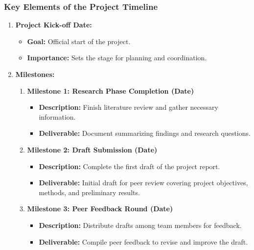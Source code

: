 \documentclass[aspectratio=169]{beamer}
\begin{document}
\begin{frame}[fragile]
    \frametitle{Key Elements of the Project Timeline}
    
    \begin{enumerate}
        \item \textbf{Project Kick-off Date:}
            \begin{itemize}
                \item \textbf{Goal:} Official start of the project.
                \item \textbf{Importance:} Sets the stage for planning and coordination.
            \end{itemize}
        
        \item \textbf{Milestones:}
            \begin{enumerate}
                \item \textbf{Milestone 1: Research Phase Completion (Date)}
                    \begin{itemize}
                        \item \textbf{Description:} Finish literature review and gather necessary information.
                        \item \textbf{Deliverable:} Document summarizing findings and research questions.
                    \end{itemize}
                    
                \item \textbf{Milestone 2: Draft Submission (Date)}
                    \begin{itemize}
                        \item \textbf{Description:} Complete the first draft of the project report.
                        \item \textbf{Deliverable:} Initial draft for peer review covering project objectives, methods, and preliminary results.
                    \end{itemize}
                    
                \item \textbf{Milestone 3: Peer Feedback Round (Date)}
                    \begin{itemize}
                        \item \textbf{Description:} Distribute drafts among team members for feedback.
                        \item \textbf{Deliverable:} Compile peer feedback to revise and improve the draft.
                    \end{itemize}
                    

\end{enumerate}
\end{enumerate}
\end{frame}
\end{document}

